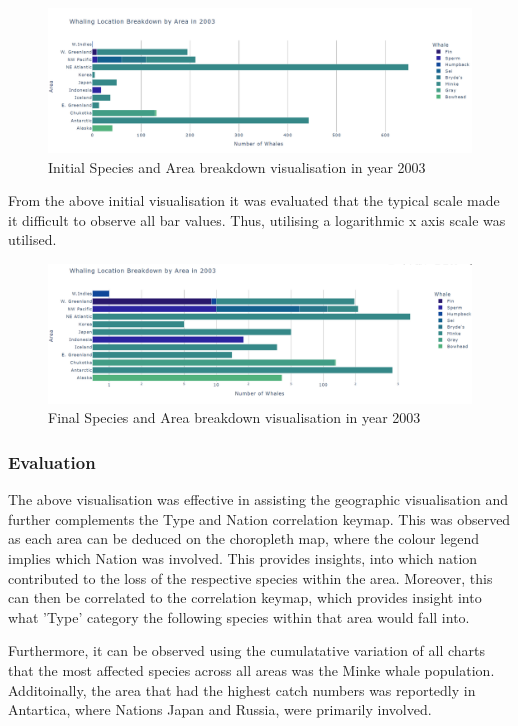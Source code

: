 \documentclass[12pt,a4paper]{article}
\begin{document}
\begin{figure}[H]
    \centering
    \includegraphics[width = 15cm]{horizontalBarNolog.png}
    \caption{Initial Species and Area breakdown visualisation in year 2003}
    \label{fig:my_label}
\end{figure}
From the above initial visualisation it was evaluated that the typical scale made it difficult to observe all bar values. Thus, utilising a logarithmic x axis scale was utilised. 

\begin{figure}[H]
    \centering
    \includegraphics[width = 15cm]{horizontalBarLog.png}
    \caption{Final Species and Area breakdown visualisation in year 2003}
    \label{fig:my_label}
\end{figure}

\subsubsection{Evaluation}
The above visualisation was effective in assisting the geographic visualisation and further complements the  Type and Nation correlation keymap. This was observed as each area can be deduced on the choropleth map, where the colour legend implies which Nation was involved. This provides insights, into which nation contributed to the loss of the respective species within the area. Moreover, this can then be correlated to the correlation keymap, which provides insight into what 'Type' category the following species within that area would fall into. 


Furthermore, it can be observed using the cumulatative variation of all charts that the most affected species across all areas was the Minke whale population. Additoinally, the area that had the highest catch numbers was reportedly in Antartica, where Nations Japan and Russia, were primarily involved. 
\end{document}
